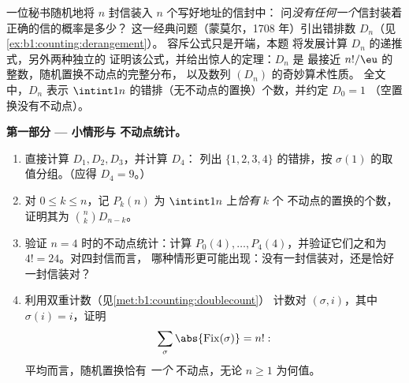 \begin{problem}\label{pb:b1:counting:1}
一位秘书随机地将 $n$ 封信装入 $n$ 个写好地址的信封中：
问\emph{没有任何一个}信封装着正确的信的概率是多少？
这一经典问题（蒙莫尔，1708 年）引出错排数
$D_n$（见\cref{ex:b1:counting:derangement}）。
容斥公式只是开端，本题
将发展计算 $D_n$ 的递推式，另外两种独立的
证明该公式，并给出惊人的定理：$D_n$ 是
最接近 $n!/\eu$ 的整数，随机置换不动点的完整分布，
以及数列
$(D_n)$ 的奇妙算术性质。
全文中，$D_n$ 表示
$\intint1n$ 的错排（无不动点的置换）个数，并约定 $D_0 = 1$
（空置换没有不动点）。

\medskip
\noindent\textbf{第一部分 --- 小情形与
不动点统计。}
\begin{enumerate}
  \item 直接计算 $D_1, D_2, D_3$，并计算 $D_4$：
        列出 $\{1, 2, 3, 4\}$ 的错排，按
        $\sigma(1)$ 的取值分组。（应得 $D_4 = 9$。）
  \item 对 $0 \leq k \leq n$，记 $P_k(n)$ 为
        $\intint1n$ 上\emph{恰有} $k$ 个
        不动点的置换的个数，证明其为 $\binom nk D_{n-k}$。
  \item 验证 $n = 4$ 时的不动点统计：计算 $P_0(4), \dots,
        P_4(4)$，并验证它们之和为 $4! = 24$。对四封信而言，
        哪种情形更可能出现：没有一封信装对，还是恰好一封信装对？
  \item 利用双重计数（见\cref{met:b1:counting:doublecount}）
        计数对 $(\sigma, i)$，其中 $\sigma(i) = i$，证明
        \[
        \sum_{\sigma} \abs{\mathrm{Fix}(\sigma)} = n! :
        \]
        平均而言，随机置换恰有 \emph{一个}
        不动点，无论 $n \geq 1$ 为何值。
\end{enumerate}


\end{problem}
